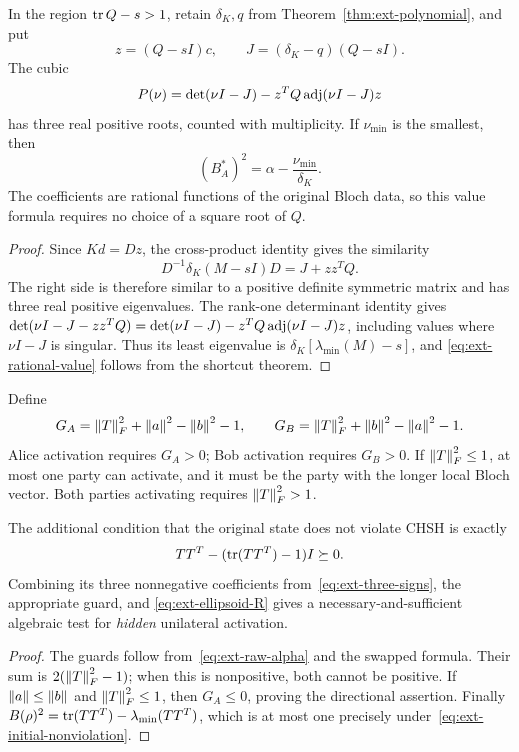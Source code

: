 \begin{corollary}
\label{cor:ext-rational-cubic}
In the region $\operatorname{tr} Q-s>1$, retain $\delta_K,q$ from
Theorem~\ref{thm:ext-polynomial}, and put
\[
 z=(Q-sI)c,\qquad J=(\delta_K-q)(Q-sI).
\]
The cubic
\begin{equation}
 P(\nu)=\det(\nu I-J)-z^TQ\operatorname{adj}(\nu I-J)z
 \label{eq:ext-rational-cubic}
\end{equation}
has three real positive roots, counted with multiplicity. If
$\nu_{\min}$ is the smallest, then
\begin{equation}
 \boxed{\quad (B_A^*)^2=\alpha-\frac{\nu_{\min}}{\delta_K}.\quad}
 \label{eq:ext-rational-value}
\end{equation}
The coefficients are rational functions of the original Bloch data,
so this value formula requires no choice of a square root of $Q$.
\end{corollary}

\begin{proof}
Since $Kd=Dz$, the cross-product identity gives the similarity
\[
 D^{-1}\delta_K(M-sI)D=J+zz^TQ.
\]
The right side is therefore similar to a positive definite symmetric
matrix and has three real positive eigenvalues.
The rank-one determinant identity gives
$\det(\nu I-J-zz^TQ)
=\det(\nu I-J)-z^TQ\operatorname{adj}(\nu I-J)z$, including values where
$\nu I-J$ is singular. Thus its least eigenvalue is
$\delta_K[\lambda_{\min}(M)-s]$, and
\eqref{eq:ext-rational-value} follows from the shortcut theorem.
\end{proof}

\begin{corollary}
\label{cor:ext-direction}
Define
\[
 G_A=\left\lVert T\right\rVert_F^2+\left\lVert a\right\rVert^2-\left\lVert b\right\rVert^2-1,\qquad
 G_B=\left\lVert T\right\rVert_F^2+\left\lVert b\right\rVert^2-\left\lVert a\right\rVert^2-1.
\]
Alice activation requires $G_A>0$; Bob activation requires $G_B>0$.
If $\left\lVert T\right\rVert_F^2\le1$, at most one party can activate, and it must be
the party with the longer local Bloch vector. Both parties activating
requires $\left\lVert T\right\rVert_F^2>1$.

The additional condition that the original state does not violate CHSH is
exactly
\begin{equation}
 TT^T-(\operatorname{tr}(TT^T)-1)I\succeq0.
 \label{eq:ext-initial-nonviolation}
\end{equation}
Combining its three nonnegative coefficients
from~\eqref{eq:ext-three-signs}, the appropriate guard, and
\eqref{eq:ext-ellipsoid-R} gives a necessary-and-sufficient algebraic
test for \emph{hidden} unilateral activation.
\end{corollary}

\begin{proof}
The guards follow from~\eqref{eq:ext-raw-alpha} and the swapped formula.
Their sum is $2(\left\lVert T\right\rVert_F^2-1)$; when this is nonpositive, both
cannot be positive. If $\left\lVert a\right\rVert\le\left\lVert b\right\rVert$ and
$\left\lVert T\right\rVert_F^2\le1$, then $G_A\le0$, proving the directional assertion.
Finally $B(\rho)^2=\operatorname{tr}(TT^T)-\lambda_{\min}(TT^T)$, which is
at most one precisely under~\eqref{eq:ext-initial-nonviolation}.
\end{proof}
